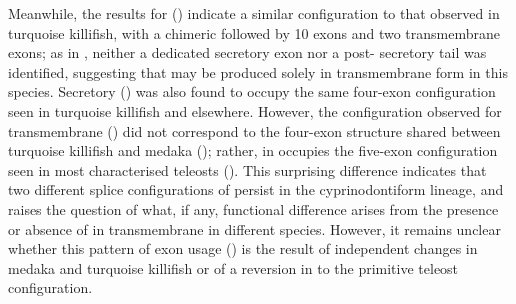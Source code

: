 Meanwhile, the results for  () indicate a similar configuration to that observed in turquoise killifish, with a chimeric  followed by 10 \cd{} exons and two transmembrane exons; as in \Nfu, neither a dedicated  secretory exon nor a post- secretory tail was identified, suggesting that  may be produced solely in transmembrane form in this species. Secretory  () was also found to occupy the same four-exon configuration seen in turquoise killifish and elsewhere. However, the configuration observed for transmembrane  () did not correspond to the four-exon structure shared between turquoise killifish and medaka (); rather,  in \Xma occupies the five-exon configuration seen in most characterised teleosts (). This surprising difference indicates that two different splice configurations of  persist in the cyprinodontiform lineage, and raises the question of what, if any, functional difference arises from the presence or absence of  in transmembrane  in different species. However, it remains unclear whether this pattern of exon usage () is the result of independent changes in medaka and turquoise killifish or of a reversion in \Xma to the primitive teleost configuration.
	
